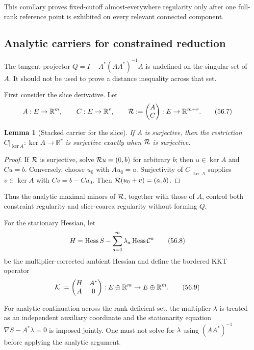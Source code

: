 \documentclass[11pt]{article}
\newtheorem{lemma}[theorem]{Lemma}
\begin{document}
This corollary proves fixed-cutoff almost-everywhere regularity only
after one full-rank reference point is exhibited on every relevant
connected component.

\subsection{Analytic carriers for constrained reduction}

The tangent projector
\(Q=I-A^*(AA^*)^{-1}A\) is undefined on the singular set of \(A\).
It should not be used to prove a distance inequality across that set.

First consider the slice derivative.  Let
\[
 A:E\to\mathbb R^m,\qquad C:E\to\mathbb R^r,\qquad
 {\cal R}:=\begin{pmatrix}A\\C\end{pmatrix}:
 E\to\mathbb R^{m+r}.                                        \tag{56.7}
\]

\begin{lemma}[Stacked carrier for the slice]
\label{lem:v11v56-stacked}
If \(A\) is surjective, then the restriction
\(C|_{\ker A}:\ker A\to\mathbb R^r\) is surjective exactly when
\({\cal R}\) is surjective.
\end{lemma}

\begin{proof}
If \({\cal R}\) is surjective, solve
\({\cal R}u=(0,b)\) for arbitrary \(b\); then
\(u\in\ker A\) and \(Cu=b\).  Conversely, choose \(u_0\) with
\(Au_0=a\).  Surjectivity of \(C|_{\ker A}\) supplies
\(v\in\ker A\) with \(Cv=b-Cu_0\).  Then
\({\cal R}(u_0+v)=(a,b)\).
\end{proof}

Thus the analytic maximal minors of \({\cal R}\), together with those
of \(A\), control both constraint regularity and slice-coarea
regularity without forming \(Q\).

For the stationary Hessian, let
\[
 H=\operatorname{Hess}S-\sum_{a=1}^m\lambda_a
                         \operatorname{Hess}{\cal C}^a        \tag{56.8}
\]
be the multiplier-corrected ambient Hessian and define the bordered
KKT operator
\[
 {\cal K}:=
 \begin{pmatrix}
        H&A^*\\
        A&0
 \end{pmatrix}:E\oplus\mathbb R^m\to E\oplus\mathbb R^m.     \tag{56.9}
\]

For analytic continuation across the rank-deficient set, the
multiplier \(\lambda\) is treated as an independent auxiliary
coordinate and the stationarity equation
\(\nabla S-A^*\lambda=0\) is imposed jointly.  One must not solve for
\(\lambda\) using \((AA^*)^{-1}\) before applying the analytic
argument.
\end{document}
